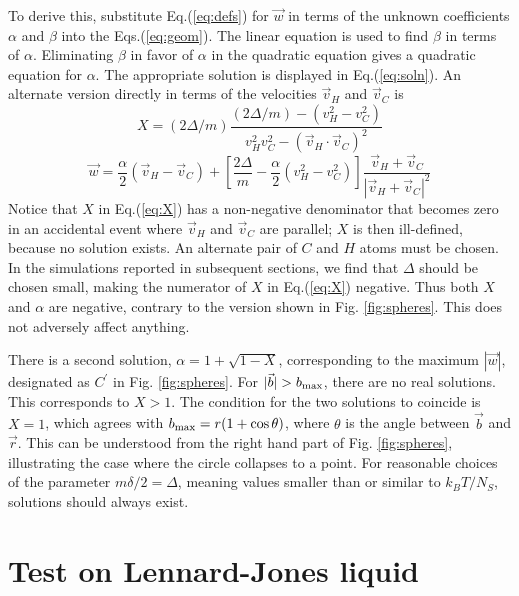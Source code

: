 \documentclass[aps,prb,twocolumn,showpacs,superscriptaddress]{revtex4-1}\begin{tiny}\end{tiny}
\begin{document}
%
To derive this, substitute Eq.(\ref{eq:defs}) for $\vec{w}$ in terms of the
unknown coefficients $\alpha$ and $\beta$ into the Eqs.(\ref{eq:geom}).  The linear equation
is used to find $\beta$ in terms of $\alpha$.  Eliminating 
$\beta$ in favor of $\alpha$ in the quadratic equation gives a quadratic equation for
$\alpha$.  The appropriate solution is displayed in Eq.(\ref{eq:soln}).
An alternate version directly in terms of the velocities $\vec{v}_H$ and $\vec{v}_C$ is
%
\begin{equation}
X= (2\Delta/m) \frac{(2\Delta/m)-(v_H^2-v_C^2)}{v_H^2 v_C^2- (\vec{v}_H\cdot\vec{v}_C)^2}
\label{eq:X}
\end{equation}
%
%
\begin{equation}
\vec{w}=\frac{\alpha}{2}(\vec{v}_H-\vec{v}_C) + \left[\frac{2\Delta}{m}-\frac{\alpha}{2}(v_H^2-v_C^2)\right]
\frac{\vec{v}_H + \vec{v}_C}{|\vec{v}_H+\vec{v}_C|^2}
\label{eq:w}
\end{equation}
%
Notice that $X$ in Eq.(\ref{eq:X}) has a non-negative denominator that becomes zero in an accidental event
where $\vec{v}_H$ and $\vec{v}_C$ are parallel;  $X$ is then ill-defined,
because no solution exists.  An alternate pair of $C$ and $H$ atoms must
be chosen.  In the simulations reported in subsequent sections, we find that $\Delta$ should be chosen small,
making the numerator of $X$ in Eq.(\ref{eq:X}) negative.  Thus both $X$ and $\alpha$ are negative, contrary
to the version shown in Fig. \ref{fig:spheres}.  This does not adversely affect anything.

There is a second solution, $\alpha = 1+\sqrt{1-X} $,
corresponding to the maximum $|\vec{w}|$, designated as $C^\prime$ in Fig. \ref{fig:spheres}.
For $|\vec{b}|>b_{\rm max}$, there are no real solutions.  This corresponds to $X>1$.
The condition for the two solutions to coincide is $X=1$, which agrees with $b_{\rm max}
=r(1+\cos\theta)$, where $\theta$ is the angle between $\vec{b}$ and $\vec{r}$.  This can be 
understood from the right hand part of Fig. \ref{fig:spheres}, illustrating the case where
the circle collapses to a point.  For reasonable choices of the parameter $m\delta/2=\Delta$,
meaning values smaller than or similar to $k_B T/N_S$, solutions should always exist.

\section{Test on Lennard-Jones liquid}
\label{sec:LJL}
\end{document}
